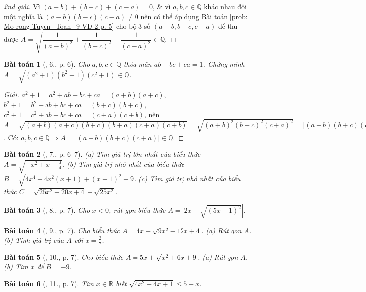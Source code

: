 \documentclass{article}
\newtheorem{baitoan}{Bài toán}
\begin{document}
\begin{proof}[2nd giải]
	Vì $(a - b) + (b - c) + (c - a) = 0$, \& vì $a,b,c\in\mathbb{Q}$ khác nhau đôi một nghĩa là $(a - b)(b - c)(c - a)\ne0$ nên có thể áp dụng Bài toán \ref{prob: Mo rong Tuyen_Toan_9 VD 2 p. 5} cho bộ 3 số $(a - b,b - c,c - a)$ để thu được $A = \sqrt{\dfrac{1}{(a - b)^2} + \dfrac{1}{(b - c)^2} + \dfrac{1}{(c - a)^2}}\in\mathbb{Q}$.
\end{proof}

\begin{baitoan}[\cite{Tuyen_Toan_9}, 6., p. 6]
	Cho $a,b,c\in\mathbb{Q}$ thỏa mãn $ab + bc + ca = 1$. Chứng minh $A = \sqrt{(a^2 + 1)(b^2 + 1)(c^2 + 1)}\in\mathbb{Q}$.
\end{baitoan}

\begin{proof}[Giải]
	$a^2 + 1 = a^2 + ab + bc + ca = (a + b)(a + c)$, $b^2 + 1 = b^2 + ab + bc + ca = (b + c)(b + a)$, $c^2 + 1 = c^2 + ab + bc + ca = (c + a)(c + b)$, nên $A = \sqrt{(a + b)(a + c)(b + c)(b + a)(c + a)(c + b)} = \sqrt{(a + b)^2(b + c)^2(c + a)^2} = |(a + b)(b + c)(c + a)|$. Có: $a,b,c\in\mathbb{Q}\Rightarrow A = |(a + b)(b + c)(c + a)|\in\mathbb{Q}$.
\end{proof}

\begin{baitoan}[\cite{Tuyen_Toan_9}, 7., p. 6--7]
	(a) Tìm giá trị lớn nhất của biểu thức $A = \sqrt{-x^2 + x + \frac{3}{4}}$. (b) Tìm giá trị nhỏ nhất của biểu thức $B = \sqrt{4x^4 - 4x^2(x + 1) + (x + 1)^2 + 9}$. (c) Tìm giá trị nhỏ nhất của biểu thức $C = \sqrt{25x^2 - 20x + 4} + \sqrt{25x^2}$.
\end{baitoan}

\begin{baitoan}[\cite{Tuyen_Toan_9}, 8., p. 7]
	Cho $x < 0$, rút gọn biểu thức $A = |2x - \sqrt{(5x - 1)^2}|$.
\end{baitoan}

\begin{baitoan}[\cite{Tuyen_Toan_9}, 9., p. 7]
	Cho biểu thức $A = 4x - \sqrt{9x^2 - 12x + 4}$. (a) Rút gọn $A$. (b) Tính giá trị của $A$ với $x = \frac{2}{7}$.
\end{baitoan}

\begin{baitoan}[\cite{Tuyen_Toan_9}, 10., p. 7]
	Cho biểu thức $A = 5x + \sqrt{x^2 + 6x + 9}$. (a) Rút gọn $A$. (b) Tìm $x$ để $B = -9$.
\end{baitoan}

\begin{baitoan}[\cite{Tuyen_Toan_9}, 11., p. 7]
	Tìm $x\in\mathbb{R}$ biết $\sqrt{4x^2 - 4x + 1}\le5 - x$.
\end{baitoan}
\end{document}
